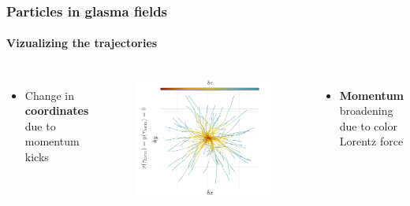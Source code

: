 \documentclass[aspectratio=169,11pt,usenames,dvipsnames]{beamer}
\begin{document}
\begin{frame}[noframenumbering]
    \frametitle{Particles in glasma fields}
    \framesubtitle{Vizualizing the trajectories}
    \vspace{-0.5cm}
    \begin{columns}[onlytextwidth,t]
            \begin{itemize}\itemsep0em 
                \item \begin{center}\footnotesize Change in {\bfseries coordinates} due to momentum kicks\end{center}
            \end{itemize}
                \vspace{-20pt}
                \begin{figure}[!hbt]
                    \centering
                \includegraphics[width=1.1\columnwidth]{images/wong_coord.png}
                \end{figure}
            \begin{itemize}\itemsep0em 
                \item \begin{center}\footnotesize {\bfseries Momentum} broadening due to color Lorentz force\end{center}

\end{itemize}
\end{columns}
\end{frame}
\end{document}
